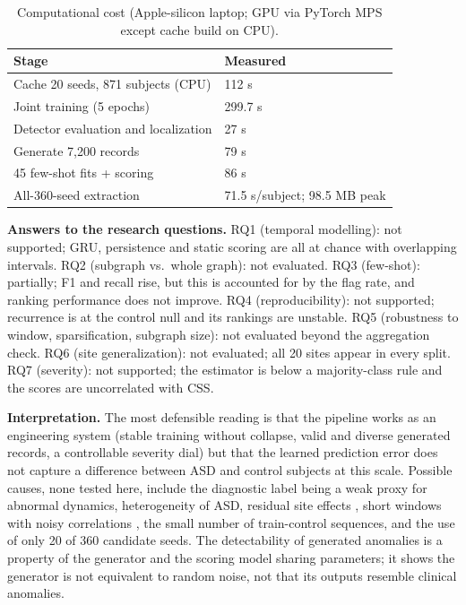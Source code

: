 \documentclass[conference]{IEEEtran}
\makeatletter
\renewcommand\section{\@startsection{section}{1}{\z@}{1.5ex plus 1.5ex minus 0.5ex}{0.7ex}{\normalfont\centering\bfseries}}
\makeatother
\begin{document}
\begin{table}[!tbp]
\caption{Computational cost (Apple-silicon laptop; GPU via PyTorch MPS except cache build on CPU).}
\label{tab:cost}
\centering\footnotesize
\begin{tabular}{@{}p{4.1cm}p{3.7cm}@{}}
\toprule
Stage & Measured \\
\midrule
Cache 20 seeds, 871 subjects (CPU) & 112 s \\
Joint training (5 epochs) & 299.7 s \\
Detector evaluation and localization & 27 s \\
Generate 7,200 records & 79 s \\
45 few-shot fits + scoring & 86 s \\
All-360-seed extraction & 71.5 s/subject; 98.5 MB peak \\
\bottomrule
\end{tabular}
\end{table}

\FloatBarrier
\section{DISCUSSION}
\label{sec:discussion}
\textbf{Answers to the research questions.} RQ1 (temporal modelling): not supported; GRU, persistence and static scoring are all at chance with overlapping intervals. RQ2 (subgraph vs.\ whole graph): not evaluated. RQ3 (few-shot): partially; F1 and recall rise, but this is accounted for by the flag rate, and ranking performance does not improve. RQ4 (reproducibility): not supported; recurrence is at the control null and its rankings are unstable. RQ5 (robustness to window, sparsification, subgraph size): not evaluated beyond the aggregation check. RQ6 (site generalization): not evaluated; all 20 sites appear in every split. RQ7 (severity): not supported; the estimator is below a majority-class rule and the scores are uncorrelated with CSS.

\textbf{Interpretation.} The most defensible reading is that the pipeline works as an engineering system (stable training without collapse, valid and diverse generated records, a controllable severity dial) but that the learned prediction error does not capture a difference between ASD and control subjects at this scale. Possible causes, none tested here, include the diagnostic label being a weak proxy for abnormal dynamics, heterogeneity of ASD, residual site effects \cite{yu2018harm,abraham2017}, short windows with noisy correlations \cite{hutchison2013}, the small number of train-control sequences, and the use of only 20 of 360 candidate seeds. The detectability of generated anomalies is a property of the generator and the scoring model sharing parameters; it shows the generator is not equivalent to random noise, not that its outputs resemble clinical anomalies.
\end{document}
